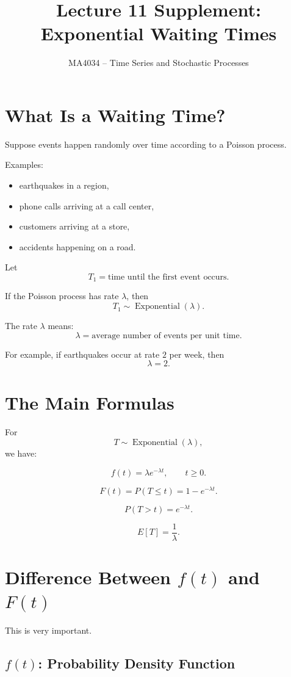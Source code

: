 \documentclass[12pt]{article}
\title{Lecture 11 Supplement: Exponential Waiting Times}
\author{MA4034 -- Time Series and Stochastic Processes}
\date{}
\begin{document}
\maketitle

\section{What Is a Waiting Time?}

Suppose events happen randomly over time according to a Poisson process.

Examples:
\begin{itemize}
    \item earthquakes in a region,
    \item phone calls arriving at a call center,
    \item customers arriving at a store,
    \item accidents happening on a road.
\end{itemize}

Let
\[
T_1=\text{time until the first event occurs}.
\]

If the Poisson process has rate \(\lambda\), then
\[
T_1\sim \operatorname{Exponential}(\lambda).
\]

The rate \(\lambda\) means:
\[
\lambda=\text{average number of events per unit time}.
\]

For example, if earthquakes occur at rate \(2\) per week, then
\[
\lambda=2.
\]

\section{The Main Formulas}

For
\[
T\sim \operatorname{Exponential}(\lambda),
\]
we have:

\[
f(t)=\lambda e^{-\lambda t}, \qquad t\geq 0.
\]

\[
F(t)=P(T\leq t)=1-e^{-\lambda t}.
\]

\[
P(T>t)=e^{-\lambda t}.
\]

\[
E[T]=\frac{1}{\lambda}.
\]

\section{Difference Between \(f(t)\) and \(F(t)\)}

This is very important.

\subsection*{\(f(t)\): Probability Density Function}
\end{document}
